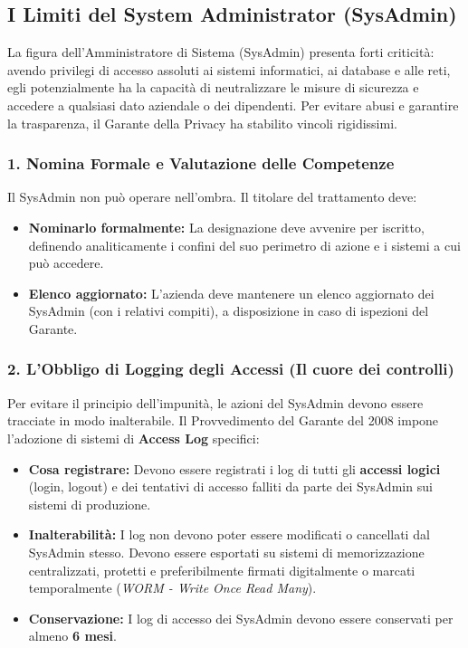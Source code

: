 \subsection{I Limiti del System Administrator (SysAdmin)}

La figura dell'Amministratore di Sistema (SysAdmin) presenta forti criticità: avendo privilegi di accesso assoluti ai sistemi informatici, ai database e alle reti, egli potenzialmente ha la capacità di neutralizzare le misure di sicurezza e accedere a qualsiasi dato aziendale o dei dipendenti. Per evitare abusi e garantire la trasparenza, il Garante della Privacy ha stabilito vincoli rigidissimi.

\subsubsection*{1. Nomina Formale e Valutazione delle Competenze}
Il SysAdmin non può operare nell'ombra. Il titolare del trattamento deve:
\begin{itemize}
    \item \textbf{Nominarlo formalmente:} La designazione deve avvenire per iscritto, definendo analiticamente i confini del suo perimetro di azione e i sistemi a cui può accedere.
    \item \textbf{Elenco aggiornato:} L'azienda deve mantenere un elenco aggiornato dei SysAdmin (con i relativi compiti), a disposizione in caso di ispezioni del Garante.
\end{itemize}

\subsubsection*{2. L'Obbligo di Logging degli Accessi (Il cuore dei controlli)}
Per evitare il principio dell'impunità, le azioni del SysAdmin devono essere tracciate in modo inalterabile. Il Provvedimento del Garante del 2008 impone l'adozione di sistemi di \textbf{Access Log} specifici:
\begin{itemize}
    \item \textbf{Cosa registrare:} Devono essere registrati i log di tutti gli \textbf{accessi logici} (login, logout) e dei tentativi di accesso falliti da parte dei SysAdmin sui sistemi di produzione.
    \item \textbf{Inalterabilità:} I log non devono poter essere modificati o cancellati dal SysAdmin stesso. Devono essere esportati su sistemi di memorizzazione centralizzati, protetti e preferibilmente firmati digitalmente o marcati temporalmente (\textit{WORM - Write Once Read Many}).
    \item \textbf{Conservazione:} I log di accesso dei SysAdmin devono essere conservati per almeno \textbf{6 mesi}.
\end{itemize}

